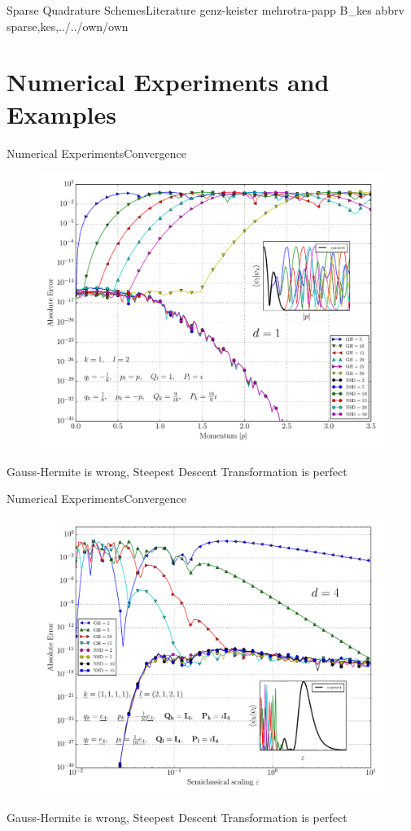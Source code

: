 \documentclass{beamer}
\begin{document}
\begin{frame}{Sparse Quadrature Schemes}{Literature}
  \nocite{sqs}{genz-keister}
  \nocite{sqs}{mehrotra-papp}
  \nocite{sqs}{B_kes}
  \scriptsize
  {abbrv}
  {sparse,kes,../../own/own}{}
\end{frame}


\section{Numerical Experiments and Examples}


\begin{frame}{Numerical Experiments}{Convergence}
  \begin{figure}
    \centering
    \includegraphics[width=0.65\linewidth]{./fig/conv_momentum.pdf}
  \end{figure}
  \scriptsize
  Gauss-Hermite is wrong, Steepest Descent Transformation is perfect
\end{frame}


\begin{frame}{Numerical Experiments}{Convergence}
  \begin{figure}
    \centering
    \includegraphics[width=0.7\linewidth]{./fig/conv_eps.pdf}
  \end{figure}
  \scriptsize
  Gauss-Hermite is wrong, Steepest Descent Transformation is perfect
\end{frame}
\end{document}
